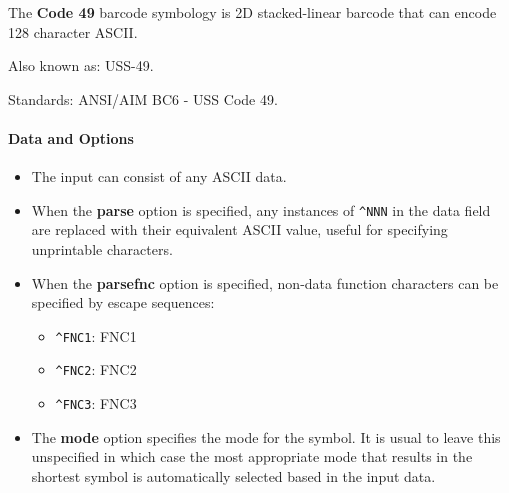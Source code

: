 The \textbf{Code 49} barcode symbology is 2D stacked-linear barcode that
can encode 128 character ASCII.

Also known as: USS-49.

Standards: ANSI/AIM BC6 - USS Code 49.

\hypertarget{data-and-options-72}{%
\paragraph{Data and Options}\label{data-and-options-72}}

\begin{itemize}
\tightlist
\item
  The input can consist of any ASCII data.
\item
  When the \textbf{parse} option is specified, any instances of
  \texttt{\^{}NNN} in the data field are replaced with their equivalent
  ASCII value, useful for specifying unprintable characters.
\item
  When the \textbf{parsefnc} option is specified, non-data function
  characters can be specified by escape sequences:

  \begin{itemize}
  \tightlist
  \item
    \texttt{\^{}FNC1}: FNC1
  \item
    \texttt{\^{}FNC2}: FNC2
  \item
    \texttt{\^{}FNC3}: FNC3
  \end{itemize}
\item
  The \textbf{mode} option specifies the mode for the symbol. It is
  usual to leave this unspecified in which case the most appropriate
  mode that results in the shortest symbol is automatically selected
  based in the input data.


\end{itemize}

